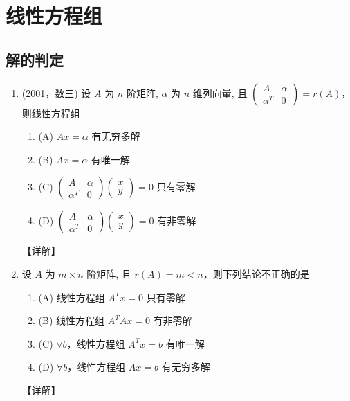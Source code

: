 \documentclass[12pt, a4paper, oneside, UTF8]{ctexbook}
\begin{document}
% 
\else
\fi
\chapter{线性方程组}

\section{解的判定}

\begin{enumerate}[label=\arabic*.]
    \item (2001，数三) 设 $A$ 为 $n$ 阶矩阵, $\alpha$ 为 $n$ 维列向量, 且 $\begin{pmatrix} A & \alpha \\ \alpha^T & 0 \end{pmatrix} = r(A)$，则线性方程组
    \begin{enumerate}
        \item (A) $Ax = \alpha$ 有无穷多解
        \item (B) $Ax = \alpha$ 有唯一解
        \item (C) $\begin{pmatrix} A & \alpha \\ \alpha^T & 0 \end{pmatrix} \begin{pmatrix} x \\ y \end{pmatrix} = 0$ 只有零解
        \item (D) $\begin{pmatrix} A & \alpha \\ \alpha^T & 0 \end{pmatrix} \begin{pmatrix} x \\ y \end{pmatrix} = 0$ 有非零解
    \end{enumerate}
    
    \begin{solution}
    【详解】
    \end{solution}
    
    \item 设 $A$ 为 $m \times n$ 阶矩阵, 且 $r(A) = m < n$，则下列结论不正确的是
    \begin{enumerate}
        \item (A) 线性方程组 $A^T x = 0$ 只有零解
        \item (B) 线性方程组 $A^T A x = 0$ 有非零解
        \item (C) $\forall b$，线性方程组 $A^T x = b$ 有唯一解
        \item (D) $\forall b$，线性方程组 $A x = b$ 有无穷多解
    \end{enumerate}
    
    \begin{solution}
    【详解】
    \end{solution}
\end{enumerate}
\end{document}
